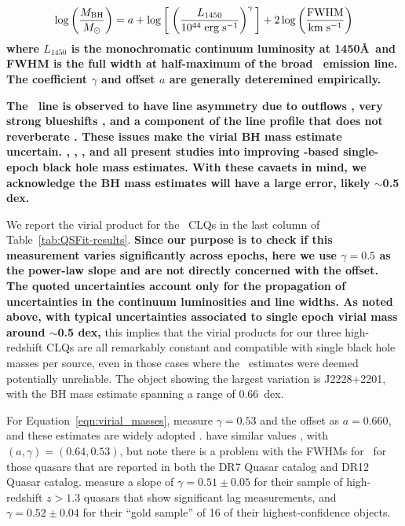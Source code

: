 \documentclass[fleqn,usenatbib]{mnras}
\begin{document}
{\bf
\begin{equation}
  \log \left( \frac{M_{\rm BH}}{M_{\odot}} \right)  = a + \log  \left[ \; \left(  \frac{L_{1450}} {10^{44} \; {\rm erg \; s^{-1}}}\right)^{\gamma} \, \right] + 2 \log \left( \frac{\rm {FWHM}}{{\rm km\; s^{-1}}} \right)
  \label{eqn:virial_masses}
\end{equation}
where $L_{1450}$ is the monochromatic continuum luminosity at 1450\AA\,
and FWHM is the full width at half-maximum of the broad \civ\ emission line.
The coefficient $\gamma$ and offset $a$ are generally deteremined empirically. 

 {\bf The \civ\ line is observed to have
line asymmetry due to outflows \citep[e.g.,][]{Gaskell1982}, very
strong blueshifts \citep[as mentioned in the Introduction, see
][]{Richards2011}, and a component of the line profile that does not
reverberate \citep[][]{Denney2012}.  These issues make the virial BH
mass estimate uncertain. \citet{Runnoe2013}, 
\citet{Mejia-Restrepo2016}, \citet{Coatman2017}, 
\citet{Mejia-Restrepo2018} and \citet{Grier2019} all present studies
into improving \civ-based single-epoch black hole mass estimates. With
these cavaets in mind, we acknowledge the BH mass estimates will have
a large error, likely $\sim$0.5 dex. }

We report the virial product for the \civ\ CLQs in the last column of
Table~\ref{tab:QSFit-results}.  {\bf Since our purpose is to check if
this measurement varies significantly across epochs, here we use
$\gamma=0.5$ as the power-law slope and are not directly concerned
with the offset.  The quoted uncertainties account only for the
propagation of uncertainties in the continuum luminosities and line
widths.  As noted above, with typical uncertainties associated to
single epoch virial mass around $\sim$0.5 dex,} this implies that the
virial products for our three high-redshift CLQs are all remarkably
constant and compatible with single black hole masses per source, even
in those cases where the \civ\ estimates were deemed potentially
unreliable. The object showing the largest variation is J2228+2201,
with the BH mass estimate spanning a range of 0.66~dex.

For Equation~\ref{eqn:virial_masses}, \citet{VestergaardPeterson2006}
measure $\gamma=0.53$ and the offset as $a=0.660$, and these estimates
are widely adopted \citep[e.g.,][]{Shen2011, Chen2019, Yao2019}.
\citet{Kozlowski2017} have similar values \citet{VestergaardPeterson2006} , with $(a,\gamma)=(0.64, 0.53)$,
but note there is a problem with the FWHMs for \civ\ for those quasars that are reported in
both the DR7 Quasar catalog and DR12 Quasar catalog.
\citet{Grier2019} measure a slope of $\gamma=0.51\pm0.05$ for their sample of high-redshift
$z>1.3$ quasars that show significant lag measurements,
and  $\gamma=0.52\pm0.04$ for their ``gold sample'' of 16 of
their highest-confidence objects. }
\end{document}
